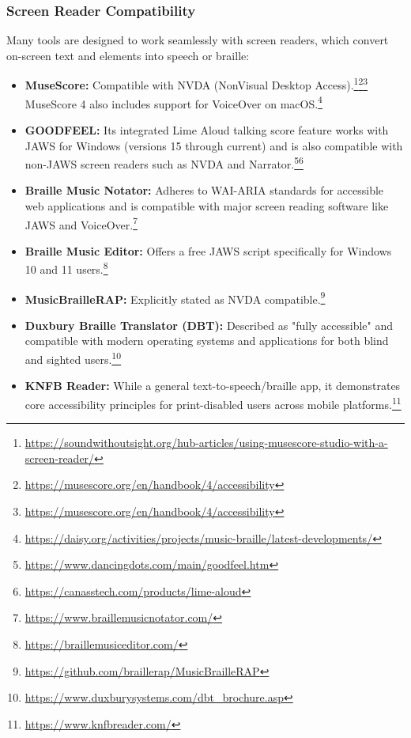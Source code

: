 \subsubsection{Screen Reader Compatibility}
Many tools are designed to work seamlessly with screen readers, which convert on-screen text and elements into speech or braille:
\begin{itemize}
    \item \textbf{MuseScore:} Compatible with NVDA (NonVisual Desktop Access).\footnote{\url{https://soundwithoutsight.org/hub-articles/using-musescore-studio-with-a-screen-reader/}}\footnote{\url{https://musescore.org/en/handbook/4/accessibility}}\footnote{\url{https://musescore.org/en/handbook/4/accessibility}} MuseScore 4 also includes support for VoiceOver on macOS.\footnote{\url{https://daisy.org/activities/projects/music-braille/latest-developments/}}
    \item \textbf{GOODFEEL:} Its integrated Lime Aloud talking score feature works with JAWS for Windows (versions 15 through current) and is also compatible with non-JAWS screen readers such as NVDA and Narrator.\footnote{\url{https://www.dancingdots.com/main/goodfeel.htm}}\footnote{\url{https://canasstech.com/products/lime-aloud}}
    \item \textbf{Braille Music Notator:} Adheres to WAI-ARIA standards for accessible web applications and is compatible with major screen reading software like JAWS and VoiceOver.\footnote{\url{https://www.braillemusicnotator.com/}}
    \item \textbf{Braille Music Editor:} Offers a free JAWS script specifically for Windows 10 and 11 users.\footnote{\url{https://braillemusiceditor.com/}}
    \item \textbf{MusicBrailleRAP:} Explicitly stated as NVDA compatible.\footnote{\url{https://github.com/braillerap/MusicBrailleRAP}}
    \item \textbf{Duxbury Braille Translator (DBT):} Described as "fully accessible" and compatible with modern operating systems and applications for both blind and sighted users.\footnote{\url{https://www.duxburysystems.com/dbt_brochure.asp}}
    \item \textbf{KNFB Reader:} While a general text-to-speech/braille app, it demonstrates core accessibility principles for print-disabled users across mobile platforms.\footnote{\url{https://www.knfbreader.com/}}
\end{itemize}

